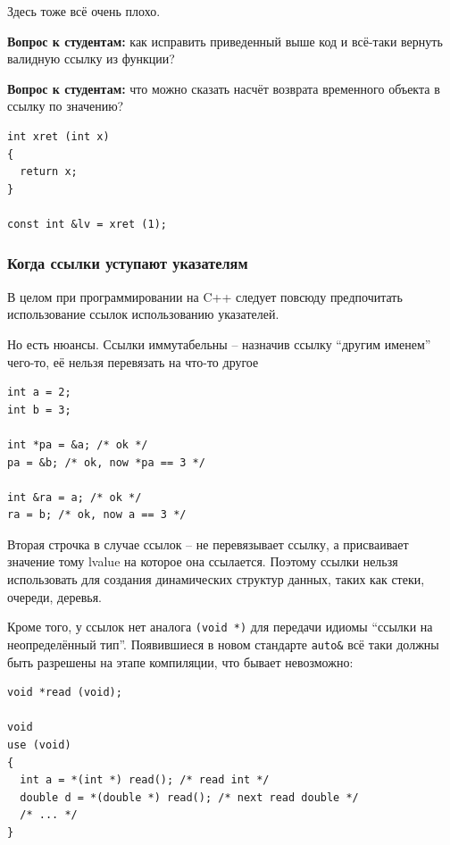 \documentclass[a4paper,12pt,oneside]{article}
\newif\ifanswers
\begin{document}
Здесь тоже всё очень плохо.

\textbf{Вопрос к студентам:} как исправить приведенный выше код и всё-таки вернуть валидную ссылку из функции?

\ifanswers
Ответов может быть много: статические переменные, динамическая аллокация, глобалы, выберите ваш вариант
\fi

\textbf{Вопрос к студентам:} что можно сказать насчёт возврата временного объекта в ссылку по значению?

\begin{lstlisting}
int xret (int x)
{
  return x;
}

const int &lv = xret (1);
\end{lstlisting}

\ifanswers
Правильный ответ: тут всё нормально, работает обсуждавшееся выше расширение срока жизни.
\fi

\subsubsection{Когда ссылки уступают указателям}\label{PointersVsRefs}

В целом при программировании на C++ следует повсюду предпочитать использование ссылок использованию указателей.

Но есть нюансы. Ссылки иммутабельны -- назначив ссылку ``другим именем'' чего-то, её нельзя перевязать на что-то другое

\begin{lstlisting}
int a = 2;
int b = 3;

int *pa = &a; /* ok */
pa = &b; /* ok, now *pa == 3 */

int &ra = a; /* ok */
ra = b; /* ok, now a == 3 */
\end{lstlisting}

Вторая строчка в случае ссылок -- не перевязывает ссылку, а присваивает значение тому lvalue на которое она ссылается. Поэтому ссылки нельзя использовать для создания динамических структур данных, таких как стеки, очереди, деревья.

Кроме того, у ссылок нет аналога \lstinline!(void *)! для передачи идиомы ``ссылки на неопределённый тип''. Появившиеся в новом стандарте \lstinline!auto&! всё таки должны быть разрешены на этапе компиляции, что бывает невозможно:

\begin{lstlisting}
void *read (void);

void 
use (void)
{
  int a = *(int *) read(); /* read int */
  double d = *(double *) read(); /* next read double */
  /* ... */
}
\end{lstlisting}
\end{document}
